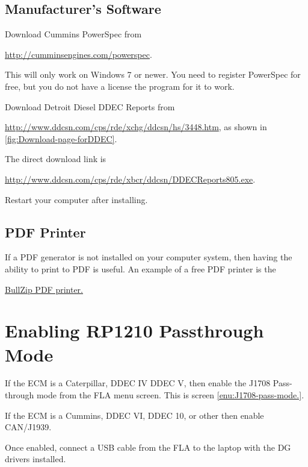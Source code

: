 \documentclass[11pt]{article}
\begin{document}
\subsection{Manufacturer's Software}

Download Cummins PowerSpec from

\href{http://cumminsengines.com/powerspec}{http://cumminsengines.com/powerspec}. 

This will only work on Windows 7 or newer. You need to register PowerSpec
for free, but you do not have a license the program for it to work.

Download Detroit Diesel DDEC Reports from

\href{ http://www.ddcsn.com/cps/rde/xchg/ddcsn/hs/3448.htm}{ http://www.ddcsn.com/cps/rde/xchg/ddcsn/hs/3448.htm},
as shown in \ref{fig:Download-page-forDDEC}.

The direct download link is

\href{http://www.ddcsn.com/cps/rde/xbcr/ddcsn/DDECReports805.exe}{http://www.ddcsn.com/cps/rde/xbcr/ddcsn/DDECReports805.exe}.

Restart your computer after installing. 


\subsection{PDF Printer}

If a PDF generator is not installed on your computer system, then
having the ability to print to PDF is useful. An example of a free
PDF printer is the 

\href{http://www.bullzip.com/products/pdf/download.php}{BullZip PDF printer.}


\section{Enabling RP1210 Passthrough Mode}

If the ECM is a Caterpillar, DDEC IV DDEC V, then enable the J1708
Pass-through mode from the FLA menu screen. This is screen \ref{enu:J1708-pass-mode.}.

If the ECM is a Cummins, DDEC VI, DDEC 10, or other then enable CAN/J1939.

Once enabled, connect a USB cable from the FLA to the laptop with
the DG drivers installed.
\end{document}
